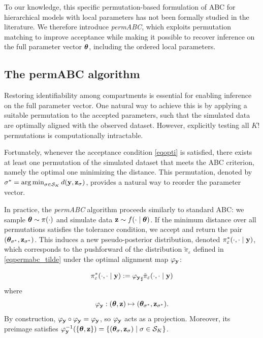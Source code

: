 To our knowledge, this specific permutation-based formulation of ABC for hierarchical models with local parameters has not been formally studied in the literature. We therefore introduce \emph{permABC}, which exploits permutation matching to improve acceptance while making it possible to recover inference on the full parameter vector \( \boldsymbol{\theta} \), including the ordered local parameters.

\subsection{The permABC algorithm}
\label{secpermabc_star}


Restoring identifiability among compartments is essential for enabling inference on the full parameter vector. One natural way to achieve this is by applying a suitable permutation to the accepted parameters, such that the simulated data are optimally aligned with the observed dataset. However, explicitly testing all \( K! \) permutations is computationally intractable.

Fortunately, whenever the acceptance condition \eqref{eqopti} is satisfied, there exists at least one permutation of the simulated dataset that meets the ABC criterion, namely the optimal one minimizing the distance. This permutation, denoted by \( \sigma^* = \operatorname*{arg\,min}_{\sigma \in \mathcal{S}_K} d(\mathbf{y}, \mathbf{z}_{\sigma}) \), provides a natural way to reorder the parameter vector.

In practice, the \emph{permABC} algorithm proceeds similarly to standard ABC: we sample \( \boldsymbol{\theta} \sim \pi(\cdot) \) and simulate data \( \mathbf{z} \sim f(\cdot \mid \boldsymbol{\theta}) \). If the minimum distance over all permutations satisfies the tolerance condition, we accept and return the pair \( (\boldsymbol{\theta}_{\sigma^*}, \mathbf{z}_{\sigma^*}) \). This induces a new pseudo-posterior distribution, denoted \( \pi_{\varepsilon}^*(\cdot, \cdot \mid \mathbf{y}) \), which corresponds to the pushforward of the distribution \( \tilde{\pi}_\varepsilon \) defined in \eqref{eqpermabc_tilde} under the optimal alignment map \( \varphi_{\mathbf{y}} \):

\begin{equation}
\label{eqproj}
\pi^{*}_{\varepsilon}(\cdot, \cdot \mid \mathbf{y})
:= {\varphi_{\mathbf{y}}}_{\sharp} \tilde{\pi}_{\varepsilon}(\cdot, \cdot \mid \mathbf{y})
\end{equation}
where
\[
\varphi_{\mathbf{y}}: (\boldsymbol{\theta}, \mathbf{z}) \mapsto (\boldsymbol{\theta}_{\sigma^*}, \mathbf{z}_{\sigma^*}).
\]
By construction, \( \varphi_{\mathbf{y}} \circ \varphi_{\mathbf{y}} = \varphi_{\mathbf{y}} \), so \( \varphi_{\mathbf{y}} \) acts as a projection. Moreover, its preimage satisfies \( \varphi_{\mathbf{y}}^{-1}(\{\boldsymbol{\theta}, \mathbf{z}\}) = \{(\boldsymbol{\theta}_{\sigma}, \mathbf{z}_{\sigma}) \mid \sigma \in \mathcal{S}_K\} \).

